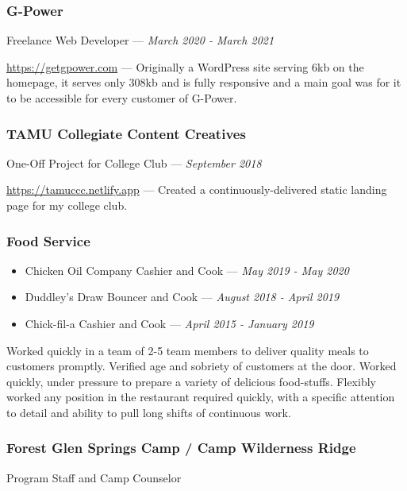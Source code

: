 \documentclass[letterpaper,10pt]{article}
\providecommand{\tightlist}
  {\setlength{\itemsep}{4pt}\setlength{\parskip}{0pt}}
\begin{document}
    \subsubsection{G-Power}
    \hfill Freelance Web Developer --- \emph{March 2020 - March 2021}

    \href{https://getgpower.com}{https://getgpower.com} --- Originally a WordPress site serving 6kb on the homepage, it serves only 308kb and is fully responsive and a main goal was for it to be accessible for every customer of G-Power.

    \subsubsection{TAMU Collegiate Content Creatives}
    \hfill One-Off Project for College Club --- \emph{September 2018}

    \href{https://tamuccc.netlify.app}{https://tamuccc.netlify.app} --- Created a continuously-delivered static landing page for my college club.

    \subsubsection{Food Service}
    
    \begin{itemize}
        \tightlist{}
        \item
        Chicken Oil Company
        \hfill Cashier and Cook --- \emph{May 2019 - May 2020}

        \item
        Duddley's Draw
        \hfill Bouncer and Cook --- \emph{August 2018 - April 2019}

        \item
        Chick-fil-a
        \hfill Cashier and Cook --- \emph{April 2015 - January 2019}
    \end{itemize}

    Worked quickly in a team of 2-5 team members to deliver quality meals to customers promptly. Verified age and sobriety of customers at the door. Worked quickly, under pressure to prepare a variety of delicious food-stuffs.  Flexibly worked any position in the restaurant required quickly, with a specific attention to detail and ability to pull long shifts of continuous work.

    \subsubsection{Forest Glen Springs Camp / Camp Wilderness Ridge}
    \hfill Program Staff and Camp Counselor 
    
\end{document}
